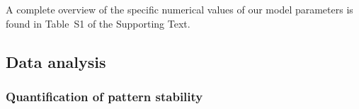 \documentclass[a4paper,10pt]{article}
\newcommand{\SI}{Supporting Text\xspace}
\begin{document}
A complete overview of the specific numerical values of our model parameters is found in Table~S1 of the \SI.


\subsection*{Data analysis}
\subsubsection*{Quantification of pattern stability}
\end{document}

